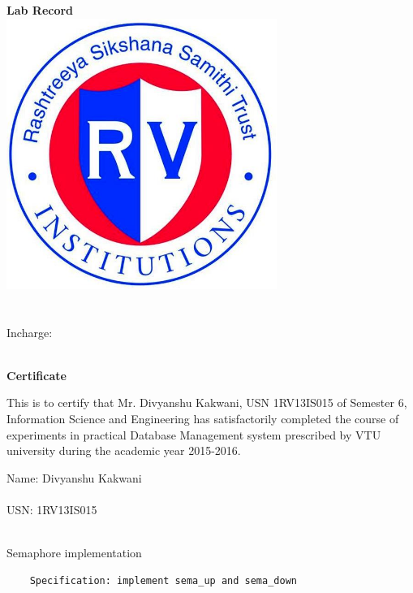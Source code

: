 \documentclass{article}
\begin{document}
\centering
\textbf{\Huge Lab Record}
\\[1in]


\includegraphics[height=250pt]{static/rvlogo.jpg}
\\[1in]

{\huge
     \\~\\
    Incharge: } \\~\\

\pagebreak


\textbf{\Huge Certificate}\\[1in]

\begin{flushleft}
{\large
    This is to certify that Mr. Divyanshu Kakwani, USN 1RV13IS015 of Semester 6, Information Science and Engineering has
satisfactorily completed the course of experiments in practical Database Management system
prescribed by VTU university during the academic year 2015-2016.\\[1in]}
\end{flushleft}


\begin{flushleft}
{\large
    Name: Divyanshu Kakwani \\~\\
    USN: 1RV13IS015 \\~\\
}
\end{flushleft}
\pagebreak


\pagebreak



{\large Semaphore implementation  } \\[0.5in]
\begin{flushleft}
\begin{lstlisting}
    Specification: implement sema_up and sema_down
\end{lstlisting}\\[1in]
\end{flushleft}
\end{document}
